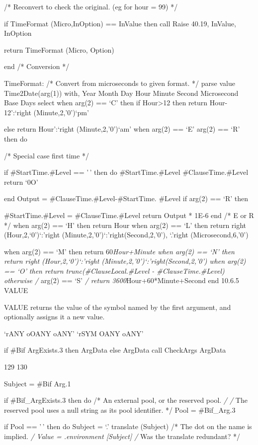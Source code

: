 /* Reconvert to check the original. (eg for hour = 99) */

if TimeFormat (Micro,InOption) == InValue then call Raise 40.19,
InValue, InOption

return TimeFormat (Micro, Option)

end /* Conversion */

TimeFormat: /* Convert from microseconds to given format. */ parse value
Time2Date(arg(1)) with, Year Month Day Hour Minute Second Microsecond
Base Days select when arg(2) == `C' then if Hour\textgreater12 then
return Hour-12':`right (Minute,2,'0')`pm'

else return Hour':`right (Minute,2,'0')`am' when arg(2) == `E'
\textbar{} arg(2) == `R' then do

/* Special case first time */

if \#StartTime.\#Level == '\,' then do \#StartTime.\#Level
\#ClauseTime.\#Level return `0O'

end Output = \#ClauseTime.\#Level-\#StartTime. \#Level if arg(2) == `R'
then

\#StartTime.\#Level = \#ClauseTime.\#Level return Output * 1E-6 end /* E
or R */ when arg(2) == `H' then return Hour when arg(2) == `L' then
return right (Hour,2,`0')`:'right (Minute,2,'0')`:'right(Second,2,'0'),
\textbar\textbar{} `.'right (Microsecond,6,'0')

when arg(2) == `M' then return 60\emph{Hour+Minute when arg(2) == `N'
then return right (Hour,2,`0')`:'right
(Minute,2,'0')`:'right(Second,2,'0') when arg(2) == `O' then return
trunc(\#ClauseLocal.\#Level - \#ClauseTime.\#Level) otherwise /} arg(2)
== `S' \emph{/ return 3600}Hour+60*Minute+Second end 10.6.5 VALUE

VALUE returns the value of the symbol named by the first argument, and
optionally assigns it a new value.

`rANY oOANY oANY' `rSYM OANY oANY'

if \#Bif ArgExists.3 then ArgData else ArgData call CheckArgs ArgData

129 130

Subject = \#Bif Arg.1

if \#Bif\_ArgExists.3 then do /* An external pool, or the reserved pool.
\emph{/ /} The reserved pool uses a null string as its pool identifier.
*/ Pool = \#Bif\_Arg.3

if Pool == '\,' then do Subject = `.' \textbar\textbar{} translate
(Subject) /* The dot on the name is implied. \emph{/ Value =
.environment {[}Subject{]} /} Was the translate redundant? */

